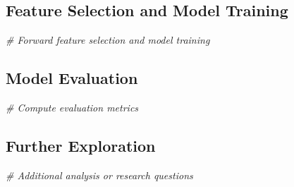 \documentclass[
]{article}
\newenvironment{Shaded}{\begin{snugshade}}{\end{snugshade}}
\newcommand{\CommentTok}[1]{\textcolor[rgb]{0.56,0.35,0.01}{\textit{#1}}}
\begin{document}
\subsection{Feature Selection and Model
Training}\label{feature-selection-and-model-training}

\begin{Shaded}
\begin{Highlighting}[]
\CommentTok{\# Forward feature selection and model training}
\end{Highlighting}
\end{Shaded}

\subsection{Model Evaluation}\label{model-evaluation}

\begin{Shaded}
\begin{Highlighting}[]
\CommentTok{\# Compute evaluation metrics}
\end{Highlighting}
\end{Shaded}

\subsection{Further Exploration}\label{further-exploration}

\begin{Shaded}
\begin{Highlighting}[]
\CommentTok{\# Additional analysis or research questions}
\end{Highlighting}
\end{Shaded}
\end{document}
